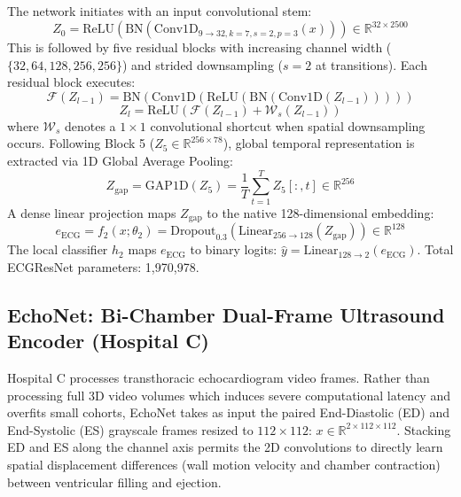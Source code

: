 \documentclass[12pt,a4paper]{amritareport}
\begin{document}
The network initiates with an input convolutional stem:
\begin{equation}
	Z_0 = \text{ReLU}\left(\text{BN}\left(\text{Conv1D}_{9 \rightarrow 32, k=7, s=2, p=3}(x)\right)\right) \in \mathbb{R}^{32 \times 2500}
\end{equation}
This is followed by five residual blocks with increasing channel width ($\{32, 64, 128, 256, 256\}$) and strided downsampling ($s=2$ at transitions). Each residual block executes:
\begin{equation}
	\mathcal{F}(Z_{l-1}) = \text{BN}\left(\text{Conv1D}\left(\text{ReLU}\left(\text{BN}\left(\text{Conv1D}(Z_{l-1})\right)\right)\right)\right)
\end{equation}
\begin{equation}
	Z_l = \text{ReLU}\left(\mathcal{F}(Z_{l-1}) + \mathcal{W}_s(Z_{l-1})\right)
\end{equation}
where $\mathcal{W}_s$ denotes a $1 \times 1$ convolutional shortcut when spatial downsampling occurs. Following Block 5 ($Z_5 \in \mathbb{R}^{256 \times 78}$), global temporal representation is extracted via 1D Global Average Pooling:
\begin{equation}
	Z_{\text{gap}} = \text{GAP1D}(Z_5) = \frac{1}{T}\sum_{t=1}^{T} Z_5[:, t] \in \mathbb{R}^{256}
\end{equation}
A dense linear projection maps $Z_{\text{gap}}$ to the native 128-dimensional embedding:
\begin{equation}
	e_{\text{ECG}} = f_2(x; \theta_2) = \text{Dropout}_{0.3}\left(\text{Linear}_{256 \rightarrow 128}(Z_{\text{gap}})\right) \in \mathbb{R}^{128}
\end{equation}
The local classifier $h_2$ maps $e_{\text{ECG}}$ to binary logits: $\hat{y} = \text{Linear}_{128 \rightarrow 2}(e_{\text{ECG}})$. Total ECGResNet parameters: 1,970,978.

\subsection{EchoNet: Bi-Chamber Dual-Frame Ultrasound Encoder (Hospital C)}
Hospital C processes transthoracic echocardiogram video frames. Rather than processing full 3D video volumes which induces severe computational latency and overfits small cohorts, EchoNet takes as input the paired End-Diastolic (ED) and End-Systolic (ES) grayscale frames resized to $112 \times 112$: $x \in \mathbb{R}^{2 \times 112 \times 112}$. Stacking ED and ES along the channel axis permits the 2D convolutions to directly learn spatial displacement differences (wall motion velocity and chamber contraction) between ventricular filling and ejection.
\end{document}
